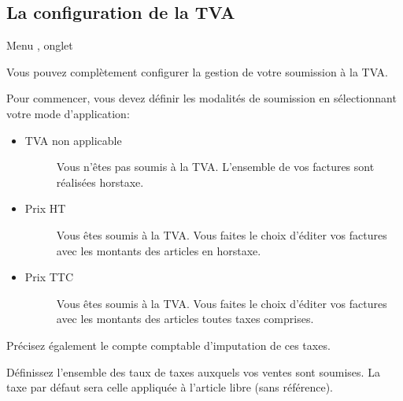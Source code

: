 \documentclass[a4paper,10pt,oneside,french]{sphinxmanual}
\begin{document}
\subsection{La configuration de la TVA}
\label{\detokenize{invoice/configuration:la-configuration-de-la-tva}}
\sphinxAtStartPar
Menu , onglet 

\sphinxAtStartPar
Vous pouvez complètement configurer la gestion de votre soumission à la TVA.

\noindent{}

\sphinxAtStartPar
Pour commencer, vous devez définir les modalités de soumission en sélectionnant votre mode d’application:
\begin{itemize}
\item {} \begin{description}
\item[{TVA non applicable}] \leavevmode
\sphinxAtStartPar
Vous n’êtes pas soumis à la TVA. L’ensemble de vos factures sont réalisées hors\sphinxhyphen{}taxe.

\end{description}

\item {} \begin{description}
\item[{Prix HT}] \leavevmode
\sphinxAtStartPar
Vous êtes soumis à la TVA. Vous faites le choix d’éditer vos factures avec les montants des articles en hors\sphinxhyphen{}taxe.

\end{description}

\item {} \begin{description}
\item[{Prix TTC}] \leavevmode
\sphinxAtStartPar
Vous êtes soumis à la TVA. Vous faites le choix d’éditer vos factures avec les montants des articles toutes taxes comprises.

\end{description}

\end{itemize}

\sphinxAtStartPar
Précisez également le compte comptable d’imputation de ces taxes.

\sphinxAtStartPar
Définissez l’ensemble des taux de taxes auxquels vos ventes sont soumises. La taxe par défaut sera celle appliquée à l’article libre (sans référence).
\end{document}
